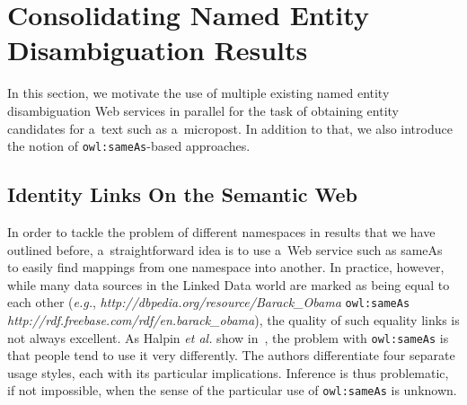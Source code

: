 \section{Consolidating Named Entity Disambiguation Results} 
\label{sec:consolidate}

In this section, we motivate the use of multiple existing named entity disambiguation Web services in parallel for the task of
obtaining entity candidates for a~text such as a~micropost. In addition to that, we also introduce the notion of
\texttt{owl:sameAs}-based approaches.

\subsection{Identity Links On the Semantic Web}                             \label{sec:sameasorg}
In order to tackle the problem of different namespaces in results that we have outlined before, a~straightforward idea is to use a~Web service such as
sameAs~\cite{Glaser:SameAs} to easily find mappings from one namespace into another. In practice,
however, while many data sources in the Linked Data world are marked as being equal to each other (\emph{e.g.},
\textit{http://dbpedia.org/resource/Barack\_Obama} \texttt{owl:sameAs} \textit{http://rdf.freebase.com/rdf/en.barack\_obama}),
the quality of such equality links is not always excellent. As Halpin \emph{et al.} show in~\cite{Halpin:SameAs}, the problem
with \texttt{owl:sameAs} is that people tend to use it very differently. The authors 
differentiate four separate usage styles, each with its particular implications. Inference is thus problematic, if not
impossible, when the sense of the particular use of \texttt{owl:sameAs} is unknown.

